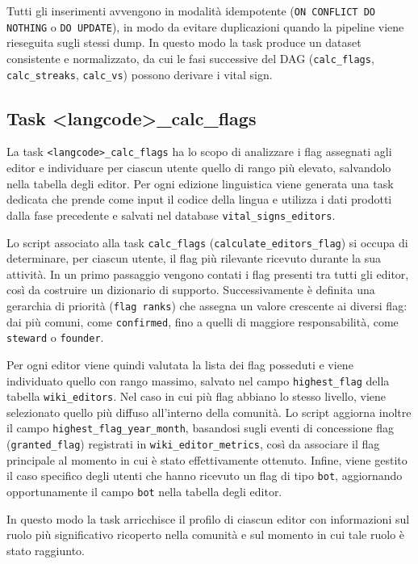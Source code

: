 Tutti gli inserimenti avvengono in modalità idempotente (\texttt{ON CONFLICT DO NOTHING} o \texttt{DO UPDATE}), in modo da evitare duplicazioni quando la pipeline viene rieseguita sugli stessi dump. 
In questo modo la task produce un dataset consistente e normalizzato, da cui le fasi successive del DAG (\texttt{calc\_flags}, \texttt{calc\_streaks}, \texttt{calc\_vs}) possono derivare i vital sign.

\subsection{Task \textless langcode\textgreater\_calc\_flags}
\label{subsec:calc_flags}

La task \texttt{<langcode>\_calc\_flags} ha lo scopo di analizzare i flag assegnati agli editor
e individuare per ciascun utente quello di rango più elevato,
salvandolo nella tabella degli editor.
Per ogni edizione linguistica viene generata una task dedicata che prende come input il codice della lingua e utilizza i dati prodotti dalla fase precedente e salvati nel database \texttt{vital\_signs\_editors}.

Lo script associato alla task \texttt{calc\_flags} (\texttt{calculate\_editors\_flag}) si occupa di determinare, per ciascun utente, il flag più rilevante ricevuto durante la sua attività. In un primo passaggio vengono contati i flag presenti tra tutti gli editor, così da costruire un dizionario di supporto. Successivamente è definita una gerarchia di priorità (\texttt{flag ranks}) che assegna un valore crescente ai diversi flag: dai più comuni, come \texttt{confirmed}, fino a quelli di maggiore responsabilità, come \texttt{steward} o \texttt{founder}.

Per ogni editor viene quindi valutata la lista dei flag posseduti e viene individuato quello con rango massimo, salvato nel campo \texttt{highest\_flag} della tabella \texttt{wiki\_editors}. Nel caso in cui più flag abbiano lo stesso livello, viene selezionato quello più diffuso all’interno della comunità. Lo script aggiorna inoltre il campo \texttt{highest\_flag\_year\_month}, basandosi sugli eventi di concessione flag (\texttt{granted\_flag}) registrati in \texttt{wiki\_editor\_metrics}, così da associare il flag principale al momento in cui è stato effettivamente ottenuto. Infine, viene gestito il caso specifico degli utenti che hanno ricevuto un flag di tipo \texttt{bot}, aggiornando opportunamente il campo \texttt{bot} nella tabella degli editor.

In questo modo la task arricchisce il profilo di ciascun editor con informazioni sul ruolo più significativo ricoperto nella comunità e sul momento in cui tale ruolo è stato raggiunto.

